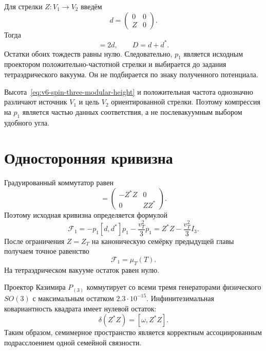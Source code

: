 Для стрелки $Z:V_1\to V_2$ введём
\begin{equation}
 d=
 \begin{pmatrix}0&0\\ Z&0\end{pmatrix}.
\end{equation}
Тогда
\begin{equation}
 [h,d]=2d,
 \qquad
 D=d+d^*.
 \label{eq:v6-spin-three-positive-modular-frequency}
\end{equation}
Остатки обоих тождеств равны нулю. Следовательно, $p_1$ является
исходным проектором положительно-частотной стрелки и выбирается до задания
тетраэдрического вакуума. Он не подбирается по знаку полученного
потенциала.

\begin{proposition}
Высота~\eqref{eq:v6-spin-three-modular-height} и положительная частота
однозначно различают источник $V_1$ и цель $V_2$ ориентированной стрелки.
Поэтому компрессия на $p_1$ является частью данных соответствия, а не
послевакуумным выбором удобного угла.
\end{proposition}

\section{Односторонняя кривизна}

Градуированный коммутатор равен
\begin{equation}
 [d,d^*]=
 \begin{pmatrix}
  -Z^*Z&0\\0&ZZ^*
 \end{pmatrix}.
\end{equation}
Поэтому исходная кривизна определяется формулой
\begin{equation}
 \mathcal F_1
 =-p_1[d,d^*]p_1-\frac{v_T^2}{3}p_1
 =Z^*Z-\frac{v_T^2}{3}I_3.
 \label{eq:v6-modular-source-tetrahedral-curvature}
\end{equation}
После ограничения $Z=Z_T$ на каноническую семёрку предыдущей главы
получаем точное равенство
\begin{equation}
 \mathcal F_1=\mu_T(T).
\end{equation}
На тетраэдрическом вакууме остаток равен нулю.

Проектор Казимира $P_{(3)}$ коммутирует со всеми тремя генераторами
физического $SO(3)$ с максимальным остатком
$2.3\cdot10^{-15}$. Инфинитезимальная ковариантность квадрата имеет
нулевой остаток:
\begin{equation}
 \delta(Z^*Z)=[\omega,Z^*Z].
\end{equation}
Таким образом, семимерное пространство является корректным
ассоциированным подрасслоением одной семейной связности.

